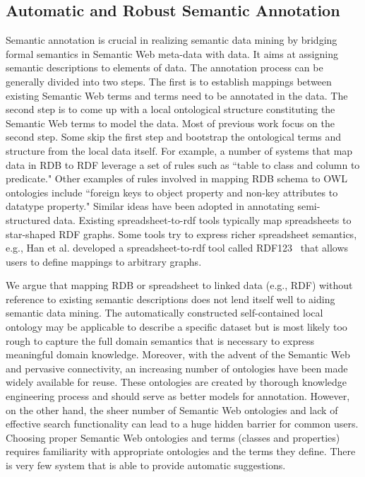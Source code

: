 \subsection{Automatic and Robust Semantic Annotation}
Semantic annotation is crucial in realizing semantic data mining by bridging formal semantics in Semantic Web meta-data with data. It aims at assigning semantic descriptions to elements of data. %
The annotation process can be generally divided into two steps. The first is to establish mappings between existing Semantic Web terms and terms need to be annotated in the data. The second step is to come up with a local ontological structure constituting the Semantic Web terms to model the data. Most of previous work focus on the second step. Some skip the first step and bootstrap the ontological terms and structure from the local data itself. For example, a number of systems that map data in RDB to RDF leverage a set of rules such as ``table to class and column to predicate." Other examples of rules involved in mapping RDB schema to OWL ontologies include ``foreign keys to object property and non-key attributes to datatype property."
Similar ideas have been adopted in annotating semi-structured data. Existing spreadsheet-to-rdf tools typically map spreadsheets to star-shaped RDF graphs. Some tools try to express richer spreadsheet semantics, e.g., Han et al. developed a spreadsheet-to-rdf tool called RDF123~\cite{RDF123} that allows users to define mappings to arbitrary graphs.

We argue that mapping RDB or spreadsheet to linked data (e.g., RDF) without reference to existing semantic descriptions does not lend itself well to aiding semantic data mining. The automatically constructed self-contained local ontology may be applicable to describe a specific dataset but is most likely too rough to capture the full domain semantics that is necessary to express meaningful domain knowledge. Moreover, with the advent of the Semantic Web and pervasive connectivity, an increasing number of ontologies have been made widely available for reuse. These ontologies are created by thorough knowledge engineering process and should serve as better models for annotation. However, on the other hand, the sheer number of Semantic Web ontologies and lack of effective search functionality can lead to a huge hidden barrier for common users. Choosing proper Semantic Web ontologies and terms (classes and properties) requires familiarity with appropriate ontologies and the terms they define. There is very few system that is able to provide automatic suggestions.

